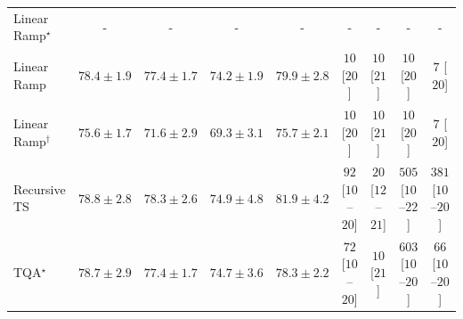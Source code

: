\begin{tabular}{l|cccc|cccc|}
Linear Ramp$^\star$ & {\cellcolor[HTML]{000000}} \color[HTML]{F1F1F1} {\cellcolor{white}} \color{black} - & {\cellcolor[HTML]{000000}} \color[HTML]{F1F1F1} {\cellcolor{white}} \color{black} - & {\cellcolor[HTML]{000000}} \color[HTML]{F1F1F1} {\cellcolor{white}} \color{black} - & {\cellcolor[HTML]{000000}} \color[HTML]{F1F1F1} {\cellcolor{white}} \color{black} - & {\cellcolor[HTML]{000000}} \color[HTML]{F1F1F1} {\cellcolor{white}} \color{black} - & {\cellcolor[HTML]{000000}} \color[HTML]{F1F1F1} {\cellcolor{white}} \color{black} - & {\cellcolor[HTML]{000000}} \color[HTML]{F1F1F1} {\cellcolor{white}} \color{black} - & {\cellcolor[HTML]{000000}} \color[HTML]{F1F1F1} {\cellcolor{white}} \color{black} - \\
Linear Ramp & {\cellcolor[HTML]{056BA7}} \color[HTML]{F1F1F1} $78.4\pm 1.9$ & {\cellcolor[HTML]{1278B4}} \color[HTML]{F1F1F1} $77.4\pm 1.7$ & {\cellcolor[HTML]{6BA5CD}} \color[HTML]{F1F1F1} $74.2\pm 1.9$ & {\cellcolor[HTML]{045B8E}} \color[HTML]{F1F1F1} $79.9\pm 2.8$ & {\cellcolor[HTML]{FFF7F3}} \color[HTML]{000000} $10$ [$20$] & {\cellcolor[HTML]{FFF7F3}} \color[HTML]{000000} $10$ [$21$] & {\cellcolor[HTML]{FFF7F3}} \color[HTML]{000000} $10$ [$20$] & {\cellcolor[HTML]{FFF7F3}} \color[HTML]{000000} $7$ [$20$] \\
Linear Ramp$^\dagger$ & {\cellcolor[HTML]{4094C3}} \color[HTML]{F1F1F1} $75.6\pm 1.7$ & {\cellcolor[HTML]{ACC0DD}} \color[HTML]{000000} $71.6\pm 2.9$ & {\cellcolor[HTML]{D8D7E9}} \color[HTML]{000000} $69.3\pm 3.1$ & {\cellcolor[HTML]{3D93C2}} \color[HTML]{F1F1F1} $75.7\pm 2.1$ & {\cellcolor[HTML]{FFF7F3}} \color[HTML]{000000} $10$ [$20$] & {\cellcolor[HTML]{FFF7F3}} \color[HTML]{000000} $10$ [$21$] & {\cellcolor[HTML]{FFF7F3}} \color[HTML]{000000} $10$ [$20$] & {\cellcolor[HTML]{FFF7F3}} \color[HTML]{000000} $7$ [$20$] \\
Recursive TS & {\cellcolor[HTML]{0567A1}} \color[HTML]{F1F1F1} $78.8\pm 2.8$ & {\cellcolor[HTML]{056CAA}} \color[HTML]{F1F1F1} $78.3\pm 2.6$ & {\cellcolor[HTML]{569DC8}} \color[HTML]{F1F1F1} $74.9\pm 4.8$ & {\cellcolor[HTML]{02395A}} \color[HTML]{F1F1F1} $81.9\pm 4.2$ & {\cellcolor[HTML]{FDE4E1}} \color[HTML]{000000} $92$ [$10$--$20$] & {\cellcolor[HTML]{FFF4F0}} \color[HTML]{000000} $20$ [$12$--$21$] & {\cellcolor[HTML]{E13B98}} \color[HTML]{F1F1F1} $505$ [$10$--$22$] & {\cellcolor[HTML]{F87CA8}} \color[HTML]{F1F1F1} $381$ [$10$--$20$] \\
TQA$^\star$ & {\cellcolor[HTML]{0568A3}} \color[HTML]{F1F1F1} $78.7\pm 2.9$ & {\cellcolor[HTML]{1278B4}} \color[HTML]{F1F1F1} $77.4\pm 1.7$ & {\cellcolor[HTML]{5C9FC9}} \color[HTML]{F1F1F1} $74.7\pm 3.6$ & {\cellcolor[HTML]{056CAA}} \color[HTML]{F1F1F1} $78.3\pm 2.2$ & {\cellcolor[HTML]{FEE9E5}} \color[HTML]{000000} $72$ [$10$--$20$] & {\cellcolor[HTML]{FFF7F3}} \color[HTML]{000000} $10$ [$21$] & {\cellcolor[HTML]{B70B83}} \color[HTML]{F1F1F1} $603$ [$10$--$20$] & {\cellcolor[HTML]{FEEAE7}} \color[HTML]{000000} $66$ [$10$--$20$] \\

\end{tabular}
